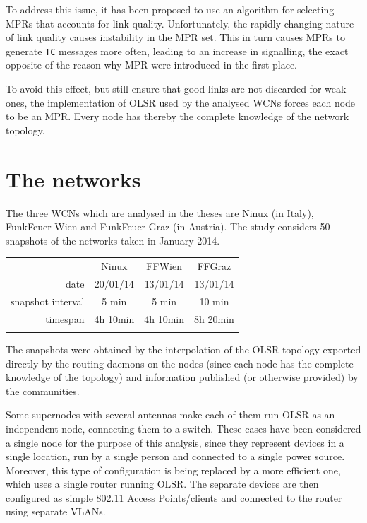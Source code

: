 \documentclass[a4paper,11pt,twoside,openleft]{memoir}
\begin{document}
To address this issue, it has been proposed to use an algorithm for
selecting MPRs that accounts for link quality. Unfortunately, the
rapidly changing nature of link quality causes instability in the MPR
set. This in turn causes MPRs to generate \texttt{TC} messages more
often, leading to an increase in signalling, the exact opposite of the
reason why MPR were introduced in the first place.

To avoid this effect, but still ensure that good links are not discarded
for weak ones, the implementation of OLSR used by the analysed WCNs
forces each node to be an MPR. Every node has thereby the complete
knowledge of the network topology.

\chapter{The networks}\label{the-networks}

The three WCNs which are analysed in the theses are Ninux (in Italy),
FunkFeuer Wien and FunkFeuer Graz (in Austria). The study considers 50
snapshots of the networks taken in January 2014.

\begin{center}
  \begin{tabular}{@{}rccc@{}}
  \toprule\addlinespace
  & Ninux & FFWien & FFGraz
  \\\addlinespace
  \midrule
  date & 20/01/14 & 13/01/14 & 13/01/14
  \\\addlinespace
  snapshot interval & 5 min & 5 min & 10 min
  \\\addlinespace
  timespan & 4h 10min & 4h 10min & 8h 20min
  \\\addlinespace
  \bottomrule
  \addlinespace
  \end{tabular}
\end{center}

The snapshots were obtained by the interpolation of the OLSR topology
exported directly by the routing daemons on the nodes (since each node
has the complete knowledge of the topology) and information published
(or otherwise provided) by the communities.

Some supernodes with several antennas make each of them run OLSR as an
independent node, connecting them to a switch. These cases have been
considered a single node for the purpose of this analysis, since they
represent devices in a single location, run by a single person and
connected to a single power source. Moreover, this type of configuration
is being replaced by a more efficient one, which uses a single router
running OLSR. The separate devices are then configured as simple 802.11
Access Points/clients and connected to the router using separate VLANs.
\end{document}
